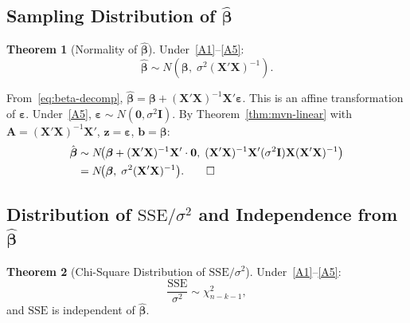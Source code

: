 \documentclass[12pt,a4paper]{article}
\makeatletter
\theoremstyle{definition}
\newtheorem{theorem}{Theorem}[section]
\renewenvironment{proof}[1][\proofname]{\par
  \pushQED{\qed}%
  \normalfont \topsep6\p@\@plus6\p@\relax
  \trivlist
  \item[\hskip\labelsep\bfseries #1\@addpunct{.}]\ignorespaces
}{%
  \popQED\endtrivlist\@endpefalse
}
\newcommand{\SSE}{\mathrm{SSE}}
\newcommand{\bX}{\mathbf{X}}
\def\bb{\boldsymbol{\beta}}
\newcommand{\be}{\boldsymbol{\varepsilon}}
\newcommand{\bI}{\mathbf{I}}
\newcommand{\bzero}{\mathbf{0}}
\newcommand{\bz}{\mathbf{z}}
\newcommand{\bA}{\mathbf{A}}
\makeatother
\begin{document}
\subsection{Sampling Distribution of \texorpdfstring{$\hat{\bb}$}{the OLS estimator}}

\begin{theorem}[Normality of $\hat{\bb}$]\label{thm:beta-dist}
Under~\ref{A1}--\ref{A5}:
\begin{equation}
\boxed{\hat{\bb} \sim N\!\left(\bb,\; \sigma^2(\bX'\bX)^{-1}\right).}
\end{equation}
\end{theorem}

\begin{proof}
From~\eqref{eq:beta-decomp}, $\hat{\bb} = \bb + (\bX'\bX)^{-1}\bX'\be$. This is an affine transformation of $\be$. Under~\ref{A5}, $\be \sim N(\bzero, \sigma^2\bI)$. By Theorem~\ref{thm:mvn-linear} with $\bA = (\bX'\bX)^{-1}\bX'$, $\bz = \be$, $\mathbf{b} = \bb$:
\begin{align*}
\hat{\bb} &\sim N\!\bigl(\bb + (\bX'\bX)^{-1}\bX' \cdot \bzero,\; (\bX'\bX)^{-1}\bX'(\sigma^2\bI)\bX(\bX'\bX)^{-1}\bigr)\\
&= N\!\bigl(\bb,\; \sigma^2(\bX'\bX)^{-1}\bigr). \qedhere
\end{align*}
\end{proof}

\subsection{Distribution of \texorpdfstring{$\SSE/\sigma^2$}{SSE/sigma\texttwosuperior} and Independence from \texorpdfstring{$\hat{\bb}$}{the OLS estimator}}

\begin{theorem}[Chi-Square Distribution of $\SSE/\sigma^2$]\label{thm:sse-dist}
Under~\ref{A1}--\ref{A5}:
\begin{equation}
\frac{\SSE}{\sigma^2} \sim \chi^2_{n-k-1},
\end{equation}
and $\SSE$ is independent of $\hat{\bb}$.
\end{theorem}
\end{document}
